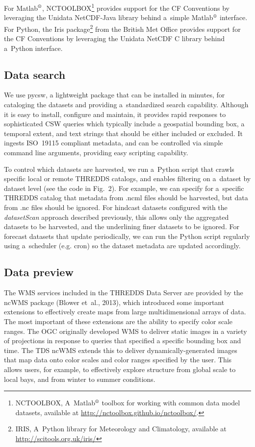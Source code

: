 \documentclass[osd, online, hvmath]{copernicus}
\begin{document}
For Matlab$^{\text{\textregistered}}$, NCTOOLBOX\footnote{NCTOOLBOX,
  A~Matlab$^{\text{\textregistered}}$ toolbox for working with common
  data model datasets, available at
  \url{http://nctoolbox.github.io/nctoolbox/}.} provides support for
the CF Conventions by leveraging the Unidata NetCDF-Java library
behind a~simple Matlab$^{\text{\textregistered}}$ interface. For
Python, the Iris package\footnote{IRIS, A~Python library for
  Meteorology and Climatology, available at
  \url{http://scitools.org.uk/iris/}} from the British Met Office
provides support for the CF Conventions by leveraging the Unidata
NetCDF C library behind a~Python interface.

\subsection{Data search}

We use pycsw, a lightweight package that can be installed
in minutes, for cataloging
the datasets and providing a~standardized search capability.  Although it is easy to install, configure and maintain, it provides rapid responses to sophisticated CSW queries which typically include a geospatial bounding box, a temporal extent, and text strings that should be either included or excluded. 
It ingests ISO~19115 compliant metadata, and can be controlled via simple command
line arguments, providing easy scripting capability.

To control which datasets are harvested, we run a~Python script that
crawls specific local or remote THREDDS catalogs, and enables
filtering on a~dataset by dataset level (see the code in Fig.~2). For
example, we can specify for a~specific THREDDS catalog that metadata
from .ncml files should be harvested, but data from .nc files should be
ignored. For hindcast datasets configured with the
\textit{datasetScan} approach described previously, this allows only
the aggregated datasets to be harvested, and the underlining finer
datasets to be ignored. For forecast datasets that update
periodically, we can run the Python script regularly using a~scheduler
(e.g. cron) so the dataset metadata are updated accordingly.

\subsection{Data preview}

The WMS services included in the
THREDDS Data Server are provided by the ncWMS package (Blower et~al.,
2013), which introduced some important extensions to effectively create maps from large multidimensional arrays of data.  The most important of these extensions are the ability to specify color scale ranges.  The OGC originally developed WMS to deliver static images in a variety of projections in response to queries that specified a specific bounding box and time.  The TDS ncWMS extends this to deliver dynamically-generated images that map  data onto color scales and color ranges specified by the user.  This allows users, for example, to effectively explore structure from global scale to local bays, and from winter to summer conditions.  
\end{document}
